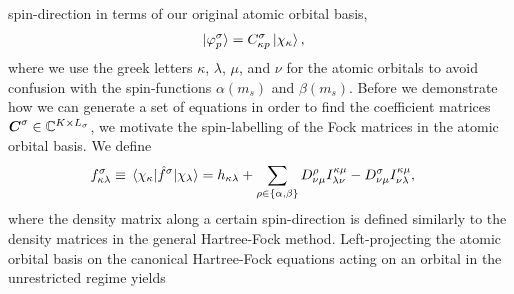             spin-direction in terms of our original atomic orbital basis,
            \begin{align}
                \ket*{\varphi^{\sigma}_{p}}
                &= C^{\sigma}_{\kappa p} \ket*{\chi_{\kappa}},
            \end{align}
            where we use the greek letters $\kappa$, $\lambda$, $\mu$, and $\nu$
            for the atomic orbitals to avoid confusion with the spin-functions
            $\alpha(m_s)$ and $\beta(m_s)$.
            Before we demonstrate how we can generate a set of equations in
            order to find the coefficient matrices $\boldsymbol{C}^{\sigma} \in
            \mathbb{C}^{K \times L_{\sigma}}$, we motivate the spin-labelling of
            the Fock matrices in the atomic orbital basis.
            We define
            \begin{align}
                f^{\sigma}_{\kappa\lambda}
                &\equiv
                \mel{\chi_{\kappa}}{\hat{f}^{\sigma}}{\chi_{\lambda}}
                =
                h_{\kappa\lambda}
                + \sum_{\rho \in \left\{ \alpha, \beta \right\}}
                D^{\rho}_{\nu\mu}
                I^{\kappa\mu}_{\lambda\nu}
                -
                D^{\sigma}_{\nu\mu}
                I^{\kappa\mu}_{\nu\lambda},
            \end{align}
            where the density matrix along a certain spin-direction is defined
            similarly to the density matrices in the general Hartree-Fock
            method.
            Left-projecting the atomic orbital basis on the canonical
            Hartree-Fock equations acting on an orbital in the unrestricted
            regime yields
